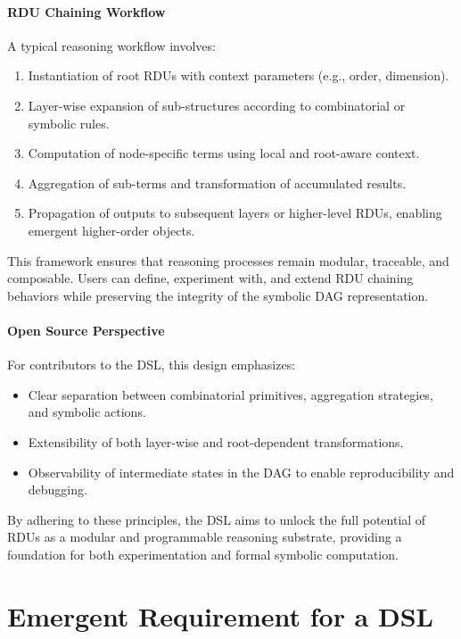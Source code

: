 \documentclass[11pt]{article}
\begin{document}
\paragraph{RDU Chaining Workflow} A typical reasoning workflow involves:
\begin{enumerate}
    \item Instantiation of root RDUs with context parameters (e.g., order, dimension).
    \item Layer-wise expansion of sub-structures according to combinatorial or symbolic rules.
    \item Computation of node-specific terms using local and root-aware context.
    \item Aggregation of sub-terms and transformation of accumulated results.
    \item Propagation of outputs to subsequent layers or higher-level RDUs, enabling emergent higher-order objects.
\end{enumerate}

This framework ensures that reasoning processes remain modular, traceable, and composable. Users can define, experiment with, and extend RDU chaining behaviors while preserving the integrity of the symbolic DAG representation.

\paragraph{Open Source Perspective} For contributors to the DSL, this design emphasizes:
\begin{itemize}
    \item Clear separation between combinatorial primitives, aggregation strategies, and symbolic actions.
    \item Extensibility of both layer-wise and root-dependent transformations.
    \item Observability of intermediate states in the DAG to enable reproducibility and debugging.
\end{itemize}

By adhering to these principles, the DSL aims to unlock the full potential of RDUs as a modular and programmable reasoning substrate, providing a foundation for both experimentation and formal symbolic computation.

\section{Emergent Requirement for a DSL}
\end{document}
